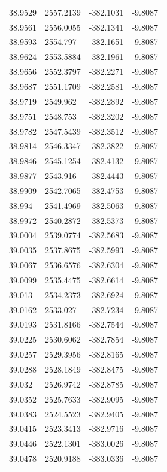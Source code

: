 \begin{table}[H]
\begin{tabular}{llll}
38.9529 & 2557.2139 & -382.1031 & -9.8087 \\
38.9561 & 2556.0055 & -382.1341 & -9.8087 \\
38.9593 & 2554.797 & -382.1651 & -9.8087 \\
38.9624 & 2553.5884 & -382.1961 & -9.8087 \\
38.9656 & 2552.3797 & -382.2271 & -9.8087 \\
38.9687 & 2551.1709 & -382.2581 & -9.8087 \\
38.9719 & 2549.962 & -382.2892 & -9.8087 \\
38.9751 & 2548.753 & -382.3202 & -9.8087 \\
38.9782 & 2547.5439 & -382.3512 & -9.8087 \\
38.9814 & 2546.3347 & -382.3822 & -9.8087 \\
38.9846 & 2545.1254 & -382.4132 & -9.8087 \\
38.9877 & 2543.916 & -382.4443 & -9.8087 \\
38.9909 & 2542.7065 & -382.4753 & -9.8087 \\
38.994 & 2541.4969 & -382.5063 & -9.8087 \\
38.9972 & 2540.2872 & -382.5373 & -9.8087 \\
39.0004 & 2539.0774 & -382.5683 & -9.8087 \\
39.0035 & 2537.8675 & -382.5993 & -9.8087 \\
39.0067 & 2536.6576 & -382.6304 & -9.8087 \\
39.0099 & 2535.4475 & -382.6614 & -9.8087 \\
39.013 & 2534.2373 & -382.6924 & -9.8087 \\
39.0162 & 2533.027 & -382.7234 & -9.8087 \\
39.0193 & 2531.8166 & -382.7544 & -9.8087 \\
39.0225 & 2530.6062 & -382.7854 & -9.8087 \\
39.0257 & 2529.3956 & -382.8165 & -9.8087 \\
39.0288 & 2528.1849 & -382.8475 & -9.8087 \\
39.032 & 2526.9742 & -382.8785 & -9.8087 \\
39.0352 & 2525.7633 & -382.9095 & -9.8087 \\
39.0383 & 2524.5523 & -382.9405 & -9.8087 \\
39.0415 & 2523.3413 & -382.9716 & -9.8087 \\
39.0446 & 2522.1301 & -383.0026 & -9.8087 \\
39.0478 & 2520.9188 & -383.0336 & -9.8087 \\

\end{tabular}
\end{table}
